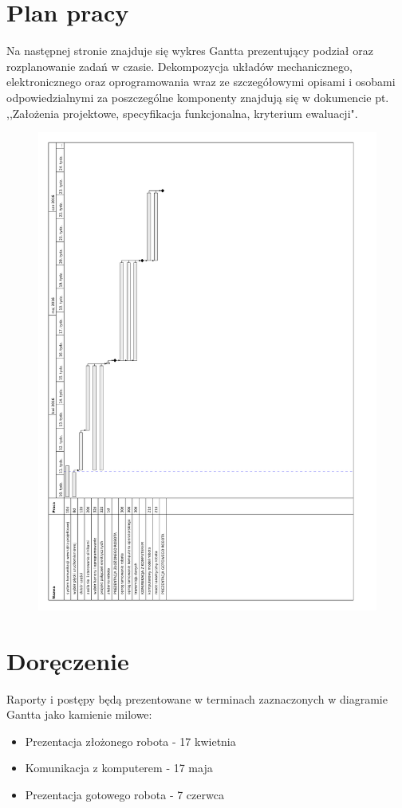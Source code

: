 \documentclass[a4paper]{article}
\begin{document}
\section{Plan pracy}
    Na następnej stronie znajduje się wykres Gantta prezentujący podział oraz rozplanowanie zadań w czasie. Dekompozycja układów mechanicznego, elektronicznego oraz oprogramowania wraz ze szczegółowymi opisami i osobami odpowiedzialnymi za poszczególne komponenty znajdują się w dokumencie pt. ,,Założenia projektowe, specyfikacja funkcjonalna, kryterium ewaluacji".    
        \begin{figure}
            \centering
            \includegraphics[scale=0.7]{autko}
            \label{fig:my_label}
        \end{figure}
\newpage
\section{Doręczenie}
    Raporty i postępy będą prezentowane w terminach zaznaczonych w diagramie Gantta jako kamienie milowe:
    \begin{itemize}
        \item Prezentacja złożonego robota - 17 kwietnia
        \item Komunikacja z komputerem - 17 maja
        \item Prezentacja gotowego robota - 7 czerwca
    \end{itemize}
\end{document}
